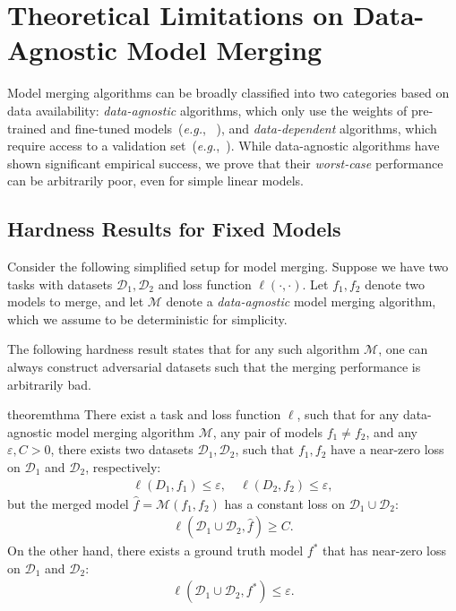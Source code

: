 \section{Theoretical Limitations on Data-Agnostic Model Merging}
Model merging algorithms can be broadly classified into two categories based on data availability: \textit{data-agnostic} algorithms, which only use the weights of pre-trained and fine-tuned models~(\emph{e.g.}, ~\citet{ilharco2022editing, yadav2024ties, yu2024language}), and \textit{data-dependent} algorithms, which require access to a validation set~(\emph{e.g.},~\citet{matena2022merging, jin2022dataless}). While data-agnostic algorithms have shown significant empirical success, we prove that their \textit{worst-case} performance can be arbitrarily poor, even for simple linear models.

\subsection{Hardness Results for Fixed Models}

Consider the following simplified setup for model merging. Suppose we have two tasks with datasets $\mathcal{D}_1, \mathcal{D}_2$ and loss function $\ell(\cdot, \cdot)$. Let $f_1, f_2$ denote two models to merge, and let $\mathcal{M}$ denote a \textit{data-agnostic} model merging algorithm, which we assume to be deterministic for simplicity. 

The following hardness result states that for any such algorithm $\mathcal{M}$, one can always construct adversarial datasets such that the merging performance is arbitrarily bad. 

\begin{restatable}{theorem}{thma}
\label{thm: a}
    There exist a task and loss function $\ell$, such that for any data-agnostic model merging algorithm $\mathcal{M}$, any pair of models $f_1\neq f_2$, and any $\varepsilon, C>0$, there exists two datasets $\mathcal{D}_1, \mathcal{D}_2$, such that $f_1, f_2$ have a near-zero loss  on $\mathcal{D}_1$ and $\mathcal{D}_2$, respectively:
    \vspace{0pt}
    \begin{align*}
        \ell(D_1, f_1)\le \varepsilon,\quad  \ell(D_2, f_2)\le \varepsilon, 
    \end{align*}
    but the merged model $\hat{f}=\mathcal{M}(f_1, f_2)$ has a constant loss on $\mathcal{D}_1\cup \mathcal{D}_2$:
    \vspace{0pt}
    \begin{align*}
        \ell(\mathcal{D}_1\cup \mathcal{D}_2, \hat{f})\ge C.
    \end{align*}
    On the other hand, there exists a ground truth model $f^*$ that has near-zero loss on $\mathcal{D}_1$ and $\mathcal{D}_2$:
    \vspace{0pt}
    \begin{align*}
        \ell(\mathcal{D}_1\cup \mathcal{D}_2, f^*)\le \varepsilon.
    \end{align*}
\end{restatable}


